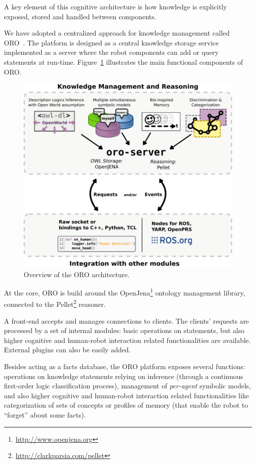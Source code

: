 \documentclass{svmult}
\begin{document}
A key element of this cognitive architecture is how knowledge is explicitly
exposed, stored and handled between components.

We have adopted a centralized approach for knowledge management called
ORO~\cite{Lemaignan2010}. The platform is designed as a central knowledge
storage service implemented as a server where the robot components can add or
query statements at run-time. Figure~\ref{fig|oro-overview} illustrates the
main functional components of ORO.

\begin{figure}
\centering
  \includegraphics[width=0.8\linewidth]{figs/oro_architecture_functional.pdf}
  \caption{Overview of the ORO architecture.}
  \label{fig|oro-overview}
\end{figure}

At the core, ORO is build around the
OpenJena\footnote{\url{http://www.openjena.org}} ontology management library,
connected to the Pellet\footnote{\url{http://clarkparsia.com/pellet}} reasoner.

A front-end accepts and manages connections to clients. The clients' requests
are processed by a set of internal modules: basic operations on statements, but
also higher cognitive and human-robot interaction related functionalities are
available. External plugins can also be easily added.

Besides acting as a facts database, the ORO platform exposes several functions:
operations on knowledge statements relying on inference (through a continuous
first-order logic classification process), management of \emph{per-agent}
symbolic models, and also higher cognitive and human-robot interaction related
functionalities like categorization of sets of concepts or profiles of memory
(that enable the robot to ``forget'' about some facts).
\end{document}
